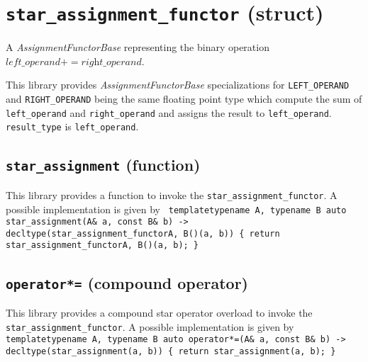 \section{\texttt{star\_assignment\_functor} (struct)}
A \textit{AssignmentFunctorBase} representing the binary operation $\textit{left\_operand} += \textit{right\_operand}$.\newline

\noindent{}This library provides \textit{AssignmentFunctorBase} specializations for
\texttt{LEFT\_OPERAND} and \texttt{RIGHT\_OPERAND} being the same    floating point
type which compute  the sum of  \texttt{left\_operand} and \texttt{right\_operand}
and assigns the result to \texttt{left\_operand}.
\texttt{result\_type} is \texttt{left\_operand}.

\subsection{\texttt{star\_assignment} (function)}
This library provides a function to invoke the \texttt{star\_assignment\_functor}.
A possible implementation is given by\newline
\texttt{
template\textlangle typename A, typename B\textrangle\newline
auto star\_assignment(A\& a, const B\& b) -> decltype(star\_assignment\_functor\textlangle A, B\textrangle()(a, b))\newline
\{ return star\_assignment\_functor\textlangle A, B\textrangle()(a, b); \}
}

\subsection{\texttt{operator*=} (compound operator)}
This library provides a compound star operator overload to invoke the \texttt{star\_assignment\_functor}.
A possible implementation is given by\newline
\texttt{
template\textlangle typename A, typename B\textrangle\newline
auto operator*=(A\& a, const B\& b) -> decltype(star\_assignment(a, b))\newline
\{ return star\_assignment(a, b); \}
}